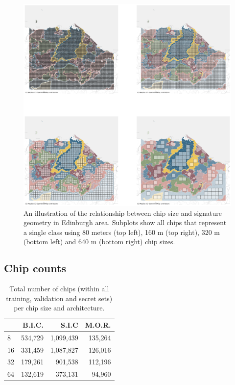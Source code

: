 \begin{figure}
    \centering
    \includegraphics[width=0.8\linewidth]{fig/chip_fits.png}
    \caption{\footnotesize An illustration of the relationship between chip size and
    signature geometry in Edinburgh area. Subplots show all chips that represent a single
    class using 80 meters (top left), 160 m (top right), 320 m (bottom left) and 640 m (bottom right) chip sizes.}
    \label{fig:chip_fits}
\end{figure}

\pagebreak

\subsection{Chip counts}
\begin{table}
    \centering
\begin{tabular}{lrrr}
    \toprule
     & B.I.C. & S.I.C & M.O.R. \\
    \midrule
    8 & 534,729 & 1,099,439 & 135,264 \\
    16 & 331,459 & 1,087,827 & 126,016 \\
    32 & 179,261 & 901,538 & 112,196 \\
    64 & 132,619 & 373,131 & 94,960 \\
    \bottomrule
    \end{tabular}
\caption{\label{tab:chip_counts}\footnotesize Total number of chips (within all training, validation and secret sets) per chip size and architecture.}
\end{table}
